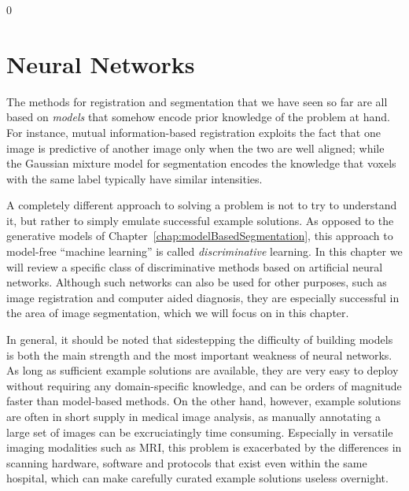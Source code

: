 \documentclass[10pt,twoside]{book}
\def\hideChapterNeuralNetworks{0}
\begin{document}
\fi

\if\hideChapterNeuralNetworks0

\chapter{Neural Networks}
\label{chap:neuralNetworks}


The methods for registration and segmentation that we have seen so far are all based on \emph{models}
that 
somehow
encode prior knowledge of the problem at hand.
For instance,
mutual information-based registration 
exploits
the fact
that one image is predictive of another image
only 
when the two are well aligned;
while the Gaussian mixture model for segmentation 
encodes the knowledge that voxels with the same label typically have similar intensities.
%

%
% 
A completely different approach to solving a problem is not to try to understand 
it, 
but rather to simply emulate successful example solutions. 
As opposed to the generative models of Chapter~\ref{chap:modelBasedSegmentation},
this approach to model-free ``machine learning'' is called \emph{discriminative} learning.
In this chapter we will review a specific class of discriminative methods based on artificial neural networks.
Although such networks can also be used for other purposes, such as image registration and computer aided diagnosis,
they are especially successful in the area of image segmentation, 
which we will focus on
in this chapter.


In general, it should be noted that sidestepping the difficulty of building models is both the main strength and the most important weakness of 
neural networks.
As long as sufficient example solutions are available, they are 
very easy to deploy without requiring any domain-specific knowledge, and can be orders of magnitude faster than model-based methods. 
On the other hand, however, example solutions are often in short supply in medical image analysis, as manually annotating a large set of images can be excruciatingly time consuming. Especially in versatile imaging modalities such as MRI, this problem is exacerbated by the differences in scanning hardware, software and protocols that exist 
even within 
the same hospital,
which can make 
carefully curated
example solutions useless overnight.
\end{document}
